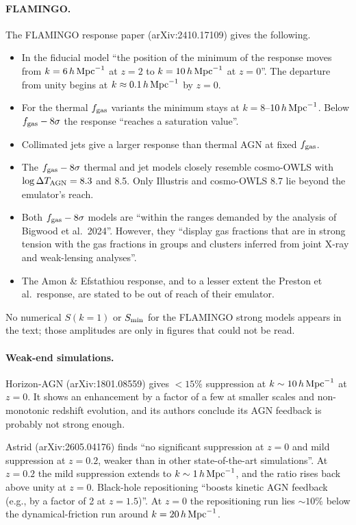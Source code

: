 \documentclass[11pt,a4paper]{article}
\begin{document}
\paragraph{FLAMINGO.} The FLAMINGO response paper (arXiv:2410.17109) gives the following.
\begin{itemize}
\item In the fiducial model ``the position of the minimum of the response moves from $k=6\,h\,{\rm Mpc}^{-1}$ at $z=2$ to $k=10\,h\,{\rm Mpc}^{-1}$ at $z=0$''. The departure from unity begins at $k\approx0.1\,h\,{\rm Mpc}^{-1}$ by $z=0$.
\item For the thermal $f_{\rm gas}$ variants the minimum stays at $k=8$--$10\,h\,{\rm Mpc}^{-1}$. Below $f_{\rm gas}-8\sigma$ the response ``reaches a saturation value''.
\item Collimated jets give a larger response than thermal AGN at fixed $f_{\rm gas}$.
\item The $f_{\rm gas}-8\sigma$ thermal and jet models closely resemble cosmo-OWLS with $\log\Delta T_{\rm AGN}=8.3$ and 8.5. Only Illustris and cosmo-OWLS 8.7 lie beyond the emulator's reach.
\item Both $f_{\rm gas}-8\sigma$ models are ``within the ranges demanded by the analysis of Bigwood et al.\ 2024''. However, they ``display gas fractions that are in strong tension with the gas fractions in groups and clusters inferred from joint X-ray and weak-lensing analyses''.
\item The Amon \& Efstathiou response, and to a lesser extent the Preston et al.\ response, are stated to be out of reach of their emulator.
\end{itemize}
No numerical $S(k=1)$ or $S_{\rm min}$ for the FLAMINGO strong models appears in the text; those amplitudes are only in figures that could not be read.

\paragraph{Weak-end simulations.} Horizon-AGN (arXiv:1801.08559) gives $<15\%$ suppression at $k\sim10\,h\,{\rm Mpc}^{-1}$ at $z=0$. It shows an enhancement by a factor of a few at smaller scales and non-monotonic redshift evolution, and its authors conclude its AGN feedback is probably not strong enough.

Astrid (arXiv:2605.04176) finds ``no significant suppression at $z=0$ and mild suppression at $z=0.2$, weaker than in other state-of-the-art simulations''. At $z=0.2$ the mild suppression extends to $k\sim1\,h\,{\rm Mpc}^{-1}$, and the ratio rises back above unity at $z=0$. Black-hole repositioning ``boosts kinetic AGN feedback (e.g., by a factor of 2 at $z=1.5$)''. At $z=0$ the repositioning run lies $\sim10\%$ below the dynamical-friction run around $k=20\,h\,{\rm Mpc}^{-1}$.
\end{document}

